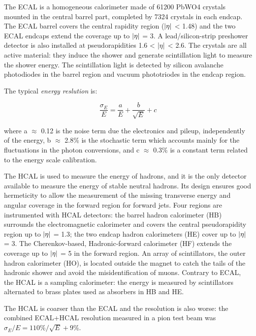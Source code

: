 \begin{outline}
    \1 The ECAL is a homogeneous calorimeter made
    of 61200 PbWO4 crystals mounted in the central barrel part, completed by 7324 crystals in
    each endcap. The ECAL barrel covers the central rapidity region ($\abs{\eta}$ < 1.48) and the two
    ECAL endcaps extend the coverage up to $\abs{\eta}$ = 3. A lead/silicon-strip preshower detector is
    also installed at pseudorapidities 1.6 < $\abs{\eta}$ < 2.6. The crystals are all active material: they
    induce the shower and generate scintillation light to measure the shower energy. The scintillation light is detected by silicon avalanche photodiodes in the barrel region and vacuum
    phototriodes in the endcap region. 
    
    The typical \emph{energy reslution} is:
    
    \begin{equation*}
        \frac{\sigma_E}{E} = \frac{a}{E} + \frac{b}{\sqrt{E}} + c
        \end{equation*}
        
    where a $\approx$ 0.12 is the noise term due the electronics and pileup, independently of the energy, b $\approx$ 2.8$\%$ is
    the stochastic term which accounts mainly for the fluctuations in the photon conversions,
    and c $\approx$ 0.3$\%$ is a constant term related to the energy scale calibration.
    
    \1 The HCAL is used to measure the energy of hadrons, and it
    is the only detector available to measure the energy of stable neutral hadrons. Its design ensures
    good hermeticity to allow the measurement of the missing transverse energy and angular
    coverage in the forward region for forward jets.
    Four regions are instrumented with HCAL detectors: the barrel hadron calorimeter (HB)
    surrounds the electromagnetic calorimeter and covers the central pseudorapidity region up
    to $\abs{\eta}$ = 1.3; the two endcap hadron calorimeters (HE) cover up to $\abs{\eta}$ = 3. The Cherenkov-based, Hadronic-forward
    calorimeter (HF) extends the coverage up to $\abs{\eta}$ = 5 in the forward region. An array of scintillators, the outer hadron calorimeter (HO), is located outside the magnet to catch the tails
    of the hadronic shower and avoid the misidentification of muons. Contrary to ECAL, the HCAL is a sampling calorimeter: the energy is measured by scintillators alternated to brass plates used as absorbers in HB and HE.
    
    The HCAL is coarser than the ECAL and the resolution is also worse:
     the combined ECAL+HCAL resolution measured in a pion test
    beam was $\sigma_E /E = 110\%/\sqrt{E} + 9\%$.
\end{outline}

